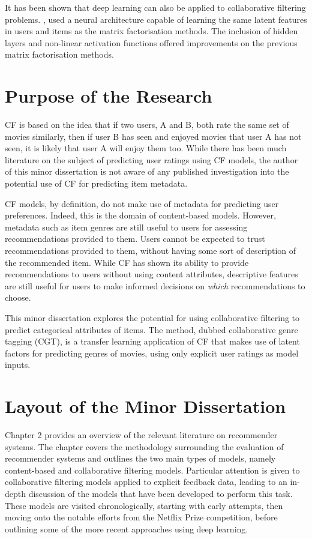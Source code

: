 It has been shown that deep learning can also be applied to collaborative filtering problems. \cite{he2017neural}, used a neural architecture capable of learning the same latent features in users and items as the matrix factorisation methods. The inclusion of hidden layers and non-linear activation functions offered improvements on the previous matrix factorisation methods.

\section{Purpose of the Research}
CF is based on the idea that if two users, A and B, both rate the same set of movies similarly, then if user B has seen and enjoyed movies that user A has not seen, it is likely that user A will enjoy them too. While there has been much literature on the subject of predicting user ratings using CF models, the author of this minor dissertation is not aware of any published investigation into the potential use of CF for predicting item metadata.

CF models, by definition, do not make use of metadata for predicting user preferences. Indeed, this is the domain of content-based models. However, metadata such as item genres are still useful to users for assessing recommendations provided to them. Users cannot be expected to trust recommendations provided to them, without having some sort of description of the recommended item. While CF has shown its ability to provide recommendations to users without using content attributes, descriptive features are still useful for users to make informed decisions on \textit{which} recommendations to choose.

This minor dissertation explores the potential for using collaborative filtering to predict categorical attributes of items. The method, dubbed collaborative genre tagging (CGT), is a transfer learning application of CF that makes use of latent factors for predicting genres of movies, using only explicit user ratings as model inputs.

\section{Layout of the Minor Dissertation}
Chapter 2 provides an overview of the relevant literature on recommender systems. The chapter covers the methodology surrounding the evaluation of recommender systems and outlines the two main types of models, namely content-based and collaborative filtering models. Particular attention is given to collaborative filtering models applied to explicit feedback data, leading to an in-depth discussion of the models that have been developed to perform this task. These models are visited chronologically, starting with early attempts, then moving onto the notable efforts from the Netflix Prize competition, before outlining some of the more recent approaches using deep learning.

